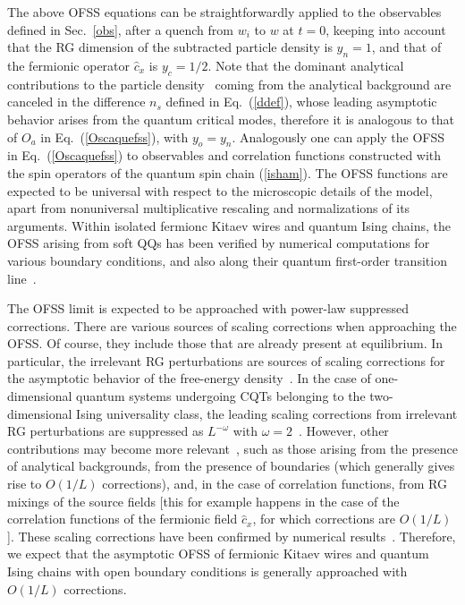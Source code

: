 The above OFSS equations can be straightforwardly applied to the
observables defined in Sec.~\ref{obs}, after a quench from $w_i$ to
$w$ at $t=0$, keeping into account that the RG dimension of the
subtracted particle density is $y_n = 1$, and that of the fermionic
operator $\hat c_x$ is $y_c=1/2$.  Note that the dominant analytical
contributions to the particle density~\cite{CV2014,rossini2021coherent} coming from
the analytical background are canceled in the difference $n_s$ defined
in Eq.~(\ref{ddef}), whose leading asymptotic behavior arises from the
quantum critical modes, therefore it is analogous to that of $O_a$ in
Eq.~(\ref{Oscaquefss}), with $y_o=y_n$.  Analogously one can apply the
OFSS in Eq.~(\ref{Oscaquefss}) to observables and correlation
functions constructed with the spin operators of the quantum spin
chain (\ref{isham}).  The OFSS functions are expected to be universal
with respect to the microscopic details of the model, apart from
nonuniversal multiplicative rescaling and normalizations of its
arguments.  Within isolated fermionc Kitaev wires and quantum Ising
chains, the OFSS arising from soft QQs has been verified by numerical
computations for various boundary conditions, and also along their
quantum first-order transition line~\cite{pelissetto2017dynamic,rossini2021coherent}.





The OFSS limit is expected to be approached with power-law suppressed
corrections.  There are various sources of scaling corrections when
approaching the OFSS. Of course, they include those that are already
present at equilibrium. In particular, the irrelevant RG perturbations
are sources of scaling corrections for the asymptotic behavior of the
free-energy density~\cite{PV2002,rossini2021coherent}.  In the case of
one-dimensional quantum systems undergoing CQTs belonging to the
two-dimensional Ising universality class, the leading scaling
corrections from irrelevant RG perturbations are suppressed as
$L^{-\omega}$ with $\omega=2$~\cite{CHPV-02,CV2014}. However, other
contributions may become more relevant~\cite{PV2002,CV2014,rossini2021coherent}, such
as those arising from the presence of analytical backgrounds, from the
presence of boundaries (which generally gives rise to $O(1/L)$
corrections), and, in the case of correlation functions, from RG
mixings of the source fields [this for example happens in the case of
  the correlation functions of the fermionic field $\hat{c}_x$, for
  which corrections are $O(1/L)$].  These scaling corrections have
been confirmed by numerical results~\cite{CV2014,rossini2021coherent}. Therefore, we
expect that the asymptotic OFSS of fermionic Kitaev wires and quantum
Ising chains with open boundary conditions is generally approached
with $O(1/L)$ corrections.




